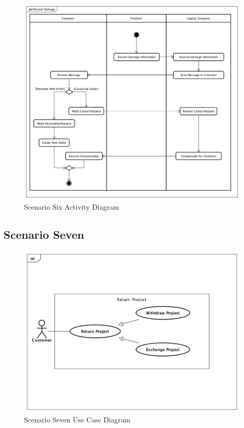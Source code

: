 \documentclass[12pt]{scrreprt}
\begin{document}
\begin{figure}[H]
  \centering\includegraphics[width=6in]{DocumentRes/6RecordDamage.png}
  \caption{Scenario Six Activity Diagram}
\end{figure}

\subsection{Scenario Seven}
\begin{figure}[H]
  \centering\includegraphics[width=5in]{DocumentRes/7UseCaseDiagram.png}
  \caption{Scenario Seven Use Case Diagram}
\end{figure}
\end{document}

